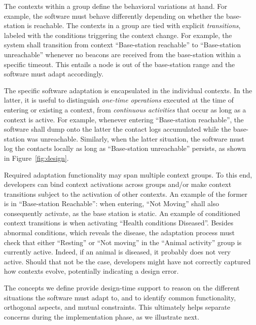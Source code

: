 The contexts within a group define the behavioral variations at
hand. For example, the software must behave differently depending on
whether the base-station is reachable.  The contexts in a group are
tied with explicit \emph{transitions}, labeled with the conditions
triggering the context change. For example, the system shall
transition from context ``Base-station reachable'' to ``Base-station
unreachable'' whenever no beacons are received from the base-station
within a specific timeout. This entails a node is out of the
base-station range and the software must adapt accordingly.

The specific software adaptation is encapsulated in the individual
contexts. In the latter, it is useful to distinguish \emph{one-time
operations} executed at the time of entering or existing a context,
from \emph{continuous activities} that occur as long as a context is
active. For example, whenever entering ``Base-station reachable'', the
software shall dump onto the latter the contact logs
accumulated while the base-station was unreachable. Similarly, when
the latter situation, the software must log the contacts locally as
long as ``Base-station unreachable'' persists, as shown in
Figure~\ref{fig:design}.

Required adaptation functionality may span multiple context groups. To
this end, developers can bind context activations across groups and/or
make context transitions subject to the activation of other
contexts. An example of the former is in ``Base-station Reachable'': when
entering, ``Not Moving'' shall also consequently activate, as the base station
is static. An example of conditioned context transitions is when activating
``Health conditions Diseased''. Besides abnormal conditions, which reveals the
disease, the adaptation process must check that either ``Resting'' or ``Not
moving'' in the ``Animal activity'' group is currently active. Indeed, if an
animal is diseased, it probably does not very active. Should that not be the
case, developers might have not correctly captured how contexts evolve,
potentially indicating a design error.

The concepts we define provide design-time support to reason on the
different situations the software must adapt to, and to identify common
functionality, orthogonal aspects, and mutual constraints. This
ultimately helps separate concerns during the implementation phase, as
we illustrate next.



